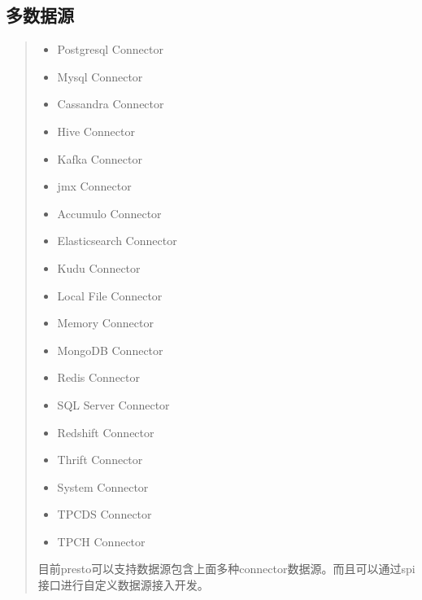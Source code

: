 \documentclass[letterpaper,10pt,english]{sphinxmanual}
\begin{document}
\subsection{多数据源}
\label{\detokenize{overview/feature:id1}}\begin{quote}
\begin{itemize}
\item {} 
Postgresql Connector

\item {} 
Mysql Connector

\item {} 
Cassandra Connector

\item {} 
Hive Connector

\item {} 
Kafka Connector

\item {} 
jmx Connector

\item {} 
Accumulo Connector

\item {} 
Elasticsearch Connector

\item {} 
Kudu Connector

\item {} 
Local File Connector

\item {} 
Memory Connector

\item {} 
MongoDB Connector

\item {} 
Redis Connector

\item {} 
SQL Server Connector

\item {} 
Redshift Connector

\item {} 
Thrift Connector

\item {} 
System Connector

\item {} 
TPCDS Connector

\item {} 
TPCH Connector

\end{itemize}

目前presto可以支持数据源包含上面多种connector数据源。而且可以通过spi接口进行自定义数据源接入开发。
\end{quote}
\end{document}
